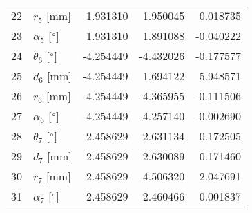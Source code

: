 \documentclass{standalone}%
\begin{document}
\begin{tabular}{llrrr}
22 &              $r_{5}$ [mm] &  1.931310 &   1.950045 &   0.018735 \\
23 &  $\alpha_{5}$ [$\degree$] &  1.931310 &   1.891088 &  -0.040222 \\
24 &  $\theta_{6}$ [$\degree$] & -4.254449 &  -4.432026 &  -0.177577 \\
25 &              $d_{6}$ [mm] & -4.254449 &   1.694122 &   5.948571 \\
26 &              $r_{6}$ [mm] & -4.254449 &  -4.365955 &  -0.111506 \\
27 &  $\alpha_{6}$ [$\degree$] & -4.254449 &  -4.257140 &  -0.002690 \\
28 &  $\theta_{7}$ [$\degree$] &  2.458629 &   2.631134 &   0.172505 \\
29 &              $d_{7}$ [mm] &  2.458629 &   2.630089 &   0.171460 \\
30 &              $r_{7}$ [mm] &  2.458629 &   4.506320 &   2.047691 \\
31 &  $\alpha_{7}$ [$\degree$] &  2.458629 &   2.460466 &   0.001837 \\
\bottomrule
\end{tabular}
%
\end{document}
